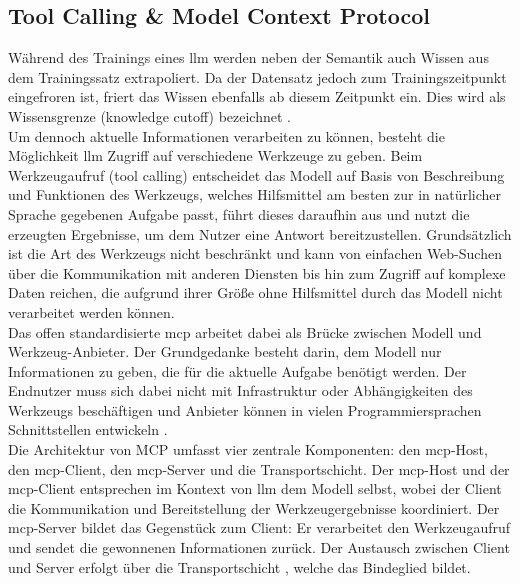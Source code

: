 \subsection{Tool Calling \& Model Context Protocol}
\label{sec:tool-calling-mcp}

Während des Trainings eines \gls{llm} werden neben der Semantik auch Wissen aus dem Trainingssatz extrapoliert.
Da der Datensatz jedoch zum Trainingszeitpunkt eingefroren ist, friert das Wissen ebenfalls ab diesem Zeitpunkt ein. Dies wird als Wissensgrenze (knowledge cutoff) bezeichnet \cite{googlecloud2025modelcontextprotocol}. \\

Um dennoch aktuelle Informationen verarbeiten zu können, besteht die Möglichkeit \gls{llm} Zugriff auf verschiedene Werkzeuge zu geben.
Beim Werkzeugaufruf (tool calling) entscheidet das Modell auf Basis von Beschreibung und Funktionen des Werkzeugs, welches Hilfsmittel am besten zur in natürlicher Sprache gegebenen Aufgabe passt,
führt dieses daraufhin aus und nutzt die erzeugten Ergebnisse, um dem Nutzer eine Antwort bereitzustellen.
Grundsätzlich ist die Art des Werkzeugs nicht beschränkt und kann von einfachen Web-Suchen über die Kommunikation mit anderen Diensten bis hin zum Zugriff auf komplexe Daten reichen, 
die aufgrund ihrer Größe ohne Hilfsmittel durch das Modell nicht verarbeitet werden können. \\

Das offen standardisierte \gls{mcp} arbeitet dabei als Brücke zwischen Modell und Werkzeug-Anbieter. 
Der Grundgedanke besteht darin, dem Modell nur Informationen zu geben, die für die aktuelle Aufgabe benötigt \cite{lfprojects2025modelcontextprotocol} werden. 
Der Endnutzer muss sich dabei nicht mit Infrastruktur oder Abhängigkeiten des Werkzeugs beschäftigen und Anbieter können in vielen Programmiersprachen Schnittstellen entwickeln \cite{github2025modelcontextprotocol}.\\

Die Architektur von MCP umfasst vier zentrale Komponenten: den \gls{mcp}-Host, den \gls{mcp}-Client, den \gls{mcp}-Server und die Transportschicht. Der \gls{mcp}-Host und der \gls{mcp}-Client entsprechen im Kontext von \gls{llm} dem Modell selbst, wobei der Client die Kommunikation und Bereitstellung der Werkzeugergebnisse koordiniert.
Der \gls{mcp}-Server bildet das Gegenstück zum Client: Er verarbeitet den Werkzeugaufruf und sendet die gewonnenen Informationen zurück. Der Austausch zwischen Client und Server erfolgt über die Transportschicht \cite{googlecloud2025modelcontextprotocol}, welche das Bindeglied bildet.


